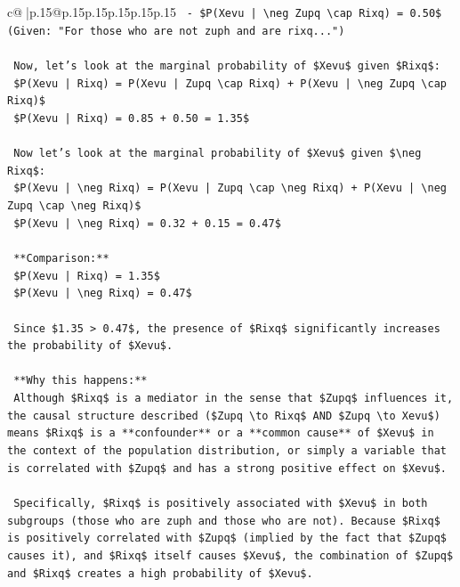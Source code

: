 \documentclass{article}
\begin{document}
{\begin{supertabular}{c@{$\;$}|p{.15\linewidth}@{}p{.15\linewidth}p{.15\linewidth}p{.15\linewidth}p{.15\linewidth}p{.15\linewidth}}
{{{\texttt{    {-} \$P(Xevu | \textbackslash{}neg Zupq \textbackslash{}cap Rixq) = 0.50\$ (Given: "For those who are not zuph and are rixq...")} \\
\\ 
\texttt{    Now, let's look at the marginal probability of \$Xevu\$ given \$Rixq\$:} \\
\texttt{    \$P(Xevu | Rixq) = P(Xevu | Zupq \textbackslash{}cap Rixq) + P(Xevu | \textbackslash{}neg Zupq \textbackslash{}cap Rixq)\$} \\
\texttt{    \$P(Xevu | Rixq) = 0.85 + 0.50 = 1.35\$} \\
\\ 
\texttt{    Now let's look at the marginal probability of \$Xevu\$ given \$\textbackslash{}neg Rixq\$:} \\
\texttt{    \$P(Xevu | \textbackslash{}neg Rixq) = P(Xevu | Zupq \textbackslash{}cap \textbackslash{}neg Rixq) + P(Xevu | \textbackslash{}neg Zupq \textbackslash{}cap \textbackslash{}neg Rixq)\$} \\
\texttt{    \$P(Xevu | \textbackslash{}neg Rixq) = 0.32 + 0.15 = 0.47\$} \\
\\ 
\texttt{    **Comparison:**} \\
\texttt{    \$P(Xevu | Rixq) = 1.35\$} \\
\texttt{    \$P(Xevu | \textbackslash{}neg Rixq) = 0.47\$} \\
\\ 
\texttt{    Since \$1.35 > 0.47\$, the presence of \$Rixq\$ significantly increases the probability of \$Xevu\$.} \\
\\ 
\texttt{    **Why this happens:**} \\
\texttt{    Although \$Rixq\$ is a mediator in the sense that \$Zupq\$ influences it, the causal structure described (\$Zupq \textbackslash{}to Rixq\$ AND \$Zupq \textbackslash{}to Xevu\$) means \$Rixq\$ is a **confounder** or a **common cause** of \$Xevu\$ in the context of the population distribution, or simply a variable that is correlated with \$Zupq\$ and has a strong positive effect on \$Xevu\$.} \\
\\ 
\texttt{    Specifically, \$Rixq\$ is positively associated with \$Xevu\$ in both subgroups (those who are zuph and those who are not). Because \$Rixq\$ is positively correlated with \$Zupq\$ (implied by the fact that \$Zupq\$ causes it), and \$Rixq\$ itself causes \$Xevu\$, the combination of \$Zupq\$ and \$Rixq\$ creates a high probability of \$Xevu\$.} \\
}}}
\end{supertabular}}
\end{document}
